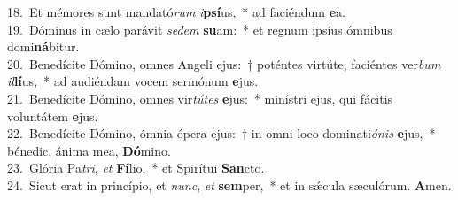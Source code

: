 {18.~}Et mémores sunt mandató\textit{rum} \textit{i}\textbf{psí}us,~* ad faciéndum \textbf{e}a.\\
{19.~}Dóminus in cælo parávit \textit{se}\textit{dem} \textbf{su}am:~* et regnum ipsíus ómnibus domi\textbf{ná}bitur.\\
{20.~}Benedícite Dómino, omnes Angeli ejus:~† poténtes virtúte, faciéntes ver\textit{bum} \textit{il}\textbf{lí}us,~* ad audiéndam vocem sermónum \textbf{e}jus.\\
{21.~}Benedícite Dómino, omnes vir\textit{tú}\textit{tes} \textbf{e}jus:~* minístri ejus, qui fácitis voluntátem \textbf{e}jus.\\
{22.~}Benedícite Dómino, ómnia ópera ejus:~† in omni loco dominati\textit{ó}\textit{nis} \textbf{e}jus,~* bénedic, ánima mea, \textbf{Dó}mino.\\
{23.~}Glória Pa\textit{tri}, \textit{et} \textbf{Fí}lio,~* et Spirítui \textbf{San}cto.\\
{24.~}Sicut erat in princípio, et \textit{nunc}, \textit{et} \textbf{sem}per,~* et in sǽcula sæculórum. \textbf{A}men.\\
